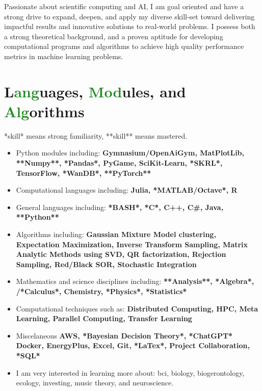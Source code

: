 \documentclass[letterpaper]{twentysecondcv} %
\begin{document}
\makeprofile %


Passionate about scientific computing and AI, I am goal oriented and have a strong drive to expand, deepen, and apply my diverse skill-set toward delivering impactful results and innovative solutions to real-world problems. I possess both a strong theoretical background, and a proven aptitude for developing computational programs and algorithms to achieve high quality performance metrics in machine learning problems.
\section{L\textcolor{ForestGreen}{ang}uages, \textcolor{ForestGreen}{Mod}ules, and \textcolor{ForestGreen}{Alg}orithms}
*skill* means strong familiarity, **skill** means mastered.
\begin{itemize}
\item Python modules including: \textbf{Gymnasium/OpenAiGym, MatPlotLib, **Numpy**, *Pandas*, PyGame, SciKit-Learn, *SKRL*, TensorFlow, *WanDB*, **PyTorch**}
\item Computational languages including: \textbf{Julia, *MATLAB/Octave*, R}
\item General languages including: \textbf{*BASH*, *C*, C++, C\#, Java, **Python**}
\item Algorithms including: \textbf{Gaussian Mixture Model clustering, Expectation Maximization, Inverse Transform Sampling, Matrix Analytic Methods using SVD, QR factorization, Rejection Sampling, Red/Black SOR, Stochastic Integration}
\item Mathematics and science disciplines including: \textbf{**Analysis**, *Algebra*, /*Calculus*, Chemistry, *Physics*, *Statistics*}
\item Computational techniques such as: \textbf{Distributed Computing, HPC, Meta Learning, Parallel Computing, Transfer Learning}
\item Miscelaneous \textbf{AWS, *Bayesian Decision Theory*, *ChatGPT* Docker, EnergyPlus, Excel, Git, *LaTex*, Project Collaboration, *SQL*}
\end{itemize}
\begin{itemize}
\item I am very interested in learning more about: bci, biology, biogerontology, ecology, investing, music theory, and neuroscience. 
\end{itemize}
\end{document}
